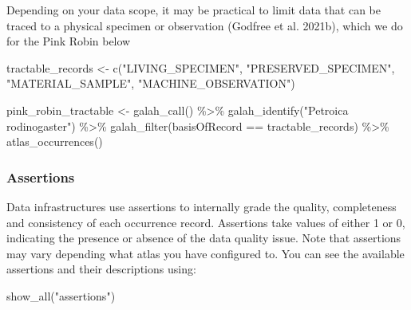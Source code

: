 \documentclass[
  letterpaper,
  DIV=11,
  numbers=noendperiod,
  oneside]{scrreprt}
\newenvironment{Shaded}{\begin{snugshade}}{\end{snugshade}}
\newcommand{\FunctionTok}[1]{\textcolor[rgb]{0.28,0.35,0.67}{#1}}
\newcommand{\NormalTok}[1]{\textcolor[rgb]{0.00,0.23,0.31}{#1}}
\newcommand{\OtherTok}[1]{\textcolor[rgb]{0.00,0.23,0.31}{#1}}
\newcommand{\SpecialCharTok}[1]{\textcolor[rgb]{0.37,0.37,0.37}{#1}}
\newcommand{\StringTok}[1]{\textcolor[rgb]{0.13,0.47,0.30}{#1}}
\begin{document}
Depending on your data scope, it may be practical to limit data that can
be traced to a physical specimen or observation (Godfree et al. 2021b),
which we do for the Pink Robin below

\begin{Shaded}
\begin{Highlighting}[]
\NormalTok{tractable\_records }\OtherTok{\textless{}{-}} \FunctionTok{c}\NormalTok{(}\StringTok{"LIVING\_SPECIMEN"}\NormalTok{, }
                       \StringTok{"PRESERVED\_SPECIMEN"}\NormalTok{, }
                       \StringTok{"MATERIAL\_SAMPLE"}\NormalTok{, }
                       \StringTok{"MACHINE\_OBSERVATION"}\NormalTok{)}

\NormalTok{pink\_robin\_tractable }\OtherTok{\textless{}{-}} \FunctionTok{galah\_call}\NormalTok{() }\SpecialCharTok{\%\textgreater{}\%} 
  \FunctionTok{galah\_identify}\NormalTok{(}\StringTok{"Petroica rodinogaster"}\NormalTok{) }\SpecialCharTok{\%\textgreater{}\%} 
  \FunctionTok{galah\_filter}\NormalTok{(basisOfRecord }\SpecialCharTok{==}\NormalTok{ tractable\_records) }\SpecialCharTok{\%\textgreater{}\%} 
  \FunctionTok{atlas\_occurrences}\NormalTok{()}
\end{Highlighting}
\end{Shaded}

\hypertarget{assertions}{%
\subsubsection{Assertions}\label{assertions}}

Data infrastructures use assertions to internally grade the quality,
completeness and consistency of each occurrence record. Assertions take
values of either 1 or 0, indicating the presence or absence of the data
quality issue. Note that assertions may vary depending what atlas you
have configured to. You can see the available assertions and their
descriptions using:

\begin{Shaded}
\begin{Highlighting}[]
\FunctionTok{show\_all}\NormalTok{(}\StringTok{"assertions"}\NormalTok{) }
\end{Highlighting}
\end{Shaded}
\end{document}
